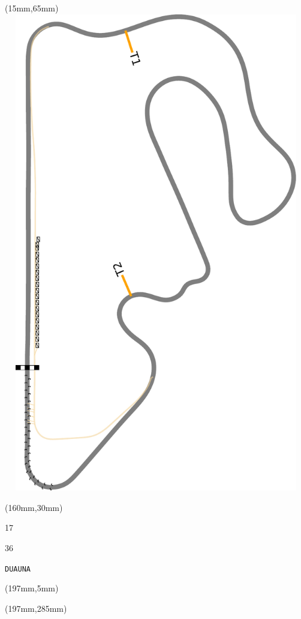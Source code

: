 \begin{textblock*}{185mm}(15mm,65mm)%
\centering
\mbox{\includegraphics[width=185mm,height=210mm,keepaspectratio]{PT/DUAUNA.pdf}}
\end{textblock*}
\begin{textblock*}{40mm}(160mm,30mm)%
\Large
\par{} 
\par17 
\par36 
\par\hfill\tiny\tt DUAUNA\\
\end{textblock*}
\begin{textblock*}{20mm}(197mm,5mm)%
\fbox{\thepage}
\label{DUAUNA}
\end{textblock*}
\begin{textblock*}{20mm}(197mm,285mm)%
\fbox{\thepage}
\end{textblock*}


